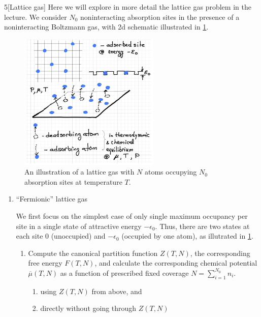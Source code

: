 \documentclass[12pt]{article}
\begin{document}
\begin{problem}{5}[Lattice gas]
Here we will explore in more detail the lattice gas problem in the lecture. We
consider $N_0$ noninteracting absorption sites in the presence of a
noninteracting Boltzmann gas, with 2d schematic illustrated in
\cref{fig:p5_illustration}.
\begin{figure}[H] 
    \centering
    \includegraphics[width=0.6\textwidth]{hw3_p5.jpg}
    \caption{An illustration of a lattice gas with $N$ atoms occupying
    $N_0$ absorption sites at temperature $T$.}
    \label{fig:p5_illustration}
\end{figure}

\begin{enumerate}[label=(\alph*)]
    
\item ``Fermionic'' lattice gas

We first focus on the simplest case of only single maximum occupancy per site in
a single state of attractive energy $-\epsilon_0$. Thus, there are two states at
each site $0$ (unoccupied) and $-\epsilon_0$ (occupied by one atom), as
illutrated in \cref{fig:p5_illustration}.

\begin{enumerate}[label=(\roman*)]
    \item Compute the canonical partition function $Z(T,N)$, the corresponding
free energy $F(T,N)$, and calculate the corresponding chemical potential
$\overline{\mu}(T,N)$ as a function of prescribed fixed coverage
$N=\sum_{i=1}^{N_0}n_i$.
\begin{enumerate}[label=(\Alph*)]
    \item using $Z(T,N)$ from above, and 
    \item directly without going through $Z(T,N)$
\end{enumerate}


\end{enumerate}
\end{enumerate}
\end{problem}
\end{document}
